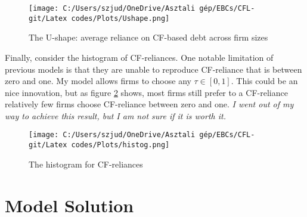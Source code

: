 \documentclass[12pt]{article}
\begin{document}
\begin{figure}[H]  %
    \centering
    \texttt{[image: C:/Users/szjud/OneDrive/Asztali gép/EBCs/CFL-git/Latex codes/Plots/Ushape.png]}
    \caption{The U-shape: average reliance on CF-based debt across firm sizes} \label{chart:Ushape}
\end{figure}

\noindent Finally, consider the histogram of CF-reliances. One notable limitation of previous models is that they are unable to reproduce CF-reliance that is between zero and one. My model allows firms to choose any $\tau \in [0,1]$. This could be an nice innovation, but as figure \ref{chart:histog} shows, most firms still prefer to a CF-reliance relatively few firms choose CF-reliance between zero and one. \textit{I went out of my way to achieve this result, but I am not sure if it is worth it.}

\begin{figure}[H]  %
    \centering
    \texttt{[image: C:/Users/szjud/OneDrive/Asztali gép/EBCs/CFL-git/Latex codes/Plots/histog.png]}
    \caption{The histogram for CF-reliances} \label{chart:histog}
\end{figure}


\newpage

\appendix
\section{Model Solution \label{sec: qualitative analysis}}
\end{document}
